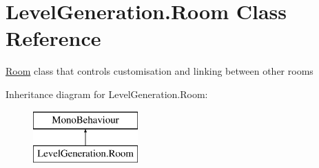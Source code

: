 \hypertarget{class_level_generation_1_1_room}{}\section{Level\+Generation.\+Room Class Reference}
\label{class_level_generation_1_1_room}


\mbox{\hyperlink{class_level_generation_1_1_room}{Room}} class that controls customisation and linking between other rooms  


Inheritance diagram for Level\+Generation.\+Room\+:\begin{figure}[H]
\begin{center}
\leavevmode
\includegraphics[height=2.000000cm]{class_level_generation_1_1_room}
\end{center}
\end{figure}
